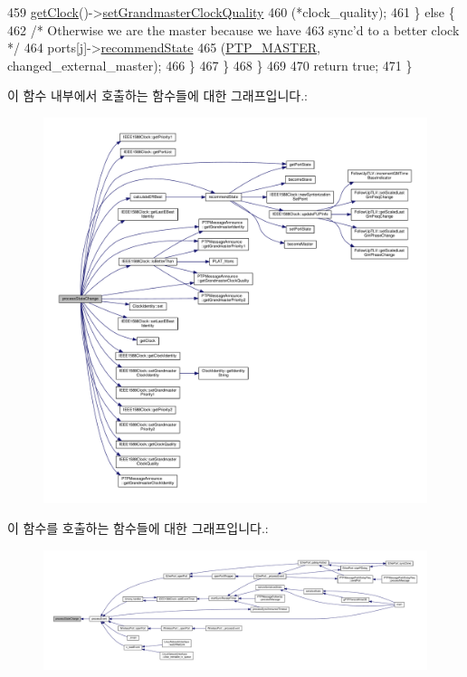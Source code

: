 \begin{DoxyCode}
459                 \hyperlink{class_common_port_ab8e59ecfb51ec14e166bc8bfc872b1ef}{getClock}()->\hyperlink{class_i_e_e_e1588_clock_af4c442ddfce5aaa4314821a118519e0a}{setGrandmasterClockQuality}
460                     (*clock\_quality);
461             \} \textcolor{keywordflow}{else} \{
462                 \textcolor{comment}{/* Otherwise we are the master because we have}
463 \textcolor{comment}{                   sync'd to a better clock */}
464                 ports[j]->\hyperlink{class_common_port_aa7588da5b66a33afeeda586e6abd334a}{recommendState}
465                     (\hyperlink{ptptypes_8hpp_a679431f1afc75d7bb9e972c022e53672ab4c763cac238b6403615a62111b64aa4}{PTP\_MASTER}, changed\_external\_master);
466             \}
467         \}
468     \}
469 
470     \textcolor{keywordflow}{return} \textcolor{keyword}{true};
471 \}
\end{DoxyCode}


이 함수 내부에서 호출하는 함수들에 대한 그래프입니다.\+:
\nopagebreak
\begin{figure}[H]
\begin{center}
\leavevmode
\includegraphics[width=350pt]{class_common_port_a11047fcdc1e80ee322dba467a051698b_cgraph}
\end{center}
\end{figure}




이 함수를 호출하는 함수들에 대한 그래프입니다.\+:
\nopagebreak
\begin{figure}[H]
\begin{center}
\leavevmode
\includegraphics[width=350pt]{class_common_port_a11047fcdc1e80ee322dba467a051698b_icgraph}
\end{center}
\end{figure}


